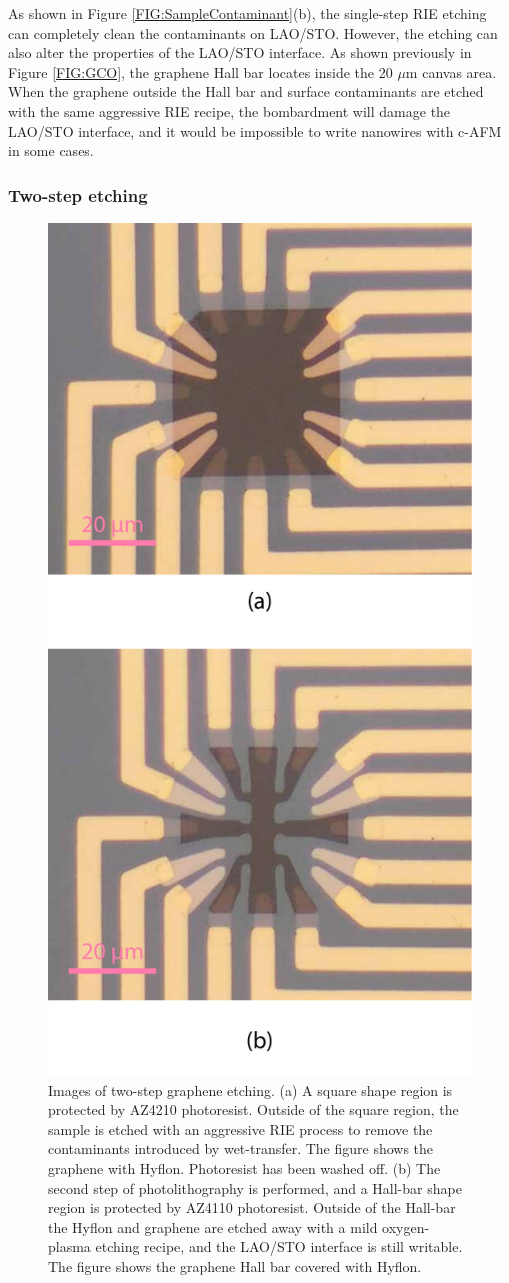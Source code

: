 \documentclass[pdflatex, sectionletters, 12pt, final, phd]{pittetd}    %
\begin{document}
As shown in Figure \ref{FIG:SampleContaminant}(b), the single-step RIE etching can completely clean the contaminants on LAO/STO. However, the etching can also alter the properties of the LAO/STO interface. As shown previously in Figure \ref{FIG:GCO}, the graphene Hall bar locates inside the 20 $\mu$m canvas area. When the graphene outside the Hall bar and surface contaminants are etched with the same aggressive RIE recipe, the bombardment will damage the LAO/STO interface, and it would be impossible to write nanowires with c-AFM in some cases.

\subsubsection{Two-step etching}

\begin{figure}[p]
	\centering
	\includegraphics[width=.5\textwidth]{Drawing/RIETwoStep.pdf}
	\caption[Images of two-step graphene etching]{Images of two-step graphene etching. (a) A square shape region is protected by AZ4210 photoresist. Outside of the square region, the sample is etched with an aggressive RIE process to remove the contaminants introduced by wet-transfer. The figure shows the graphene with Hyflon. Photoresist has been washed off. (b) The second step of photolithography is performed, and a Hall-bar shape region is protected by AZ4110 photoresist. Outside of the Hall-bar the Hyflon and graphene are etched away with a mild oxygen-plasma etching recipe, and the LAO/STO interface is still writable. The figure shows the graphene Hall bar covered with Hyflon. }
	\label{FIG:RIETwoStep}
\end{figure}
\end{document}
